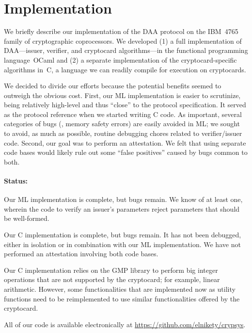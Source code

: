 \section{Implementation}

We briefly describe our implementation of the DAA protocol on the IBM~4765
family of cryptographic coprocessors.
We developed (1) a
full implementation of DAA---issuer, verifier, and cryptocard algorithms---in the
functional programming language~OCaml and (2) a separate implementation of the cryptocard-specific algorithms in~C, a language we can readily compile
for execution on cryptocards.

We decided to divide our efforts because the potential benefits seemed to outweigh
the obvious cost.
First, our ML implementation is easier to
scrutinize, being relatively high-level and thus ``close'' to the protocol specification.
It served as the protocol reference when we started writing C code.
As important, several categories of bugs (\eg, memory safety errors) are easily avoided in ML;
we sought to avoid, as much as possible, routine debugging chores related to verifier/issuer code.
Second, our goal was to perform an attestation.
We felt that using separate code bases
would likely rule out some ``false positives'' caused
by bugs common to both.

\paragraph*{Status:}
Our ML implementation is complete, but bugs remain.
We know of at least one, wherein the code to verify an issuer's parameters
reject parameters that should be well-formed.

Our C implementation is complete, but bugs remain.
It has not been debugged, either in isolation
or in combination with our ML implementation. We have
not performed an attestation involving both code bases.

Our C implementation relies on the GMP library
to perform big integer operations that are not supported by the
cryptocard; for example, linear arithmetic. However, some functionalities that are
implemented now as utility functions need to be reimplemented to use similar
functionalities offered by the cryptocard.

All of our code is available electronically at
\url{https://github.com/elnikety/crypsys}.
